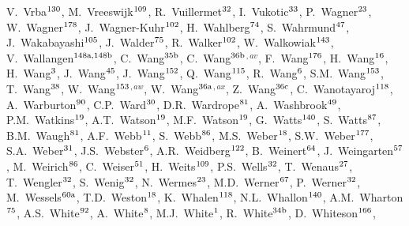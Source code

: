 \begin{flushleft}
V.~Vrba$^\textrm{\scriptsize 130}$,
M.~Vreeswijk$^\textrm{\scriptsize 109}$,
R.~Vuillermet$^\textrm{\scriptsize 32}$,
I.~Vukotic$^\textrm{\scriptsize 33}$,
P.~Wagner$^\textrm{\scriptsize 23}$,
W.~Wagner$^\textrm{\scriptsize 178}$,
J.~Wagner-Kuhr$^\textrm{\scriptsize 102}$,
H.~Wahlberg$^\textrm{\scriptsize 74}$,
S.~Wahrmund$^\textrm{\scriptsize 47}$,
J.~Wakabayashi$^\textrm{\scriptsize 105}$,
J.~Walder$^\textrm{\scriptsize 75}$,
R.~Walker$^\textrm{\scriptsize 102}$,
W.~Walkowiak$^\textrm{\scriptsize 143}$,
V.~Wallangen$^\textrm{\scriptsize 148a,148b}$,
C.~Wang$^\textrm{\scriptsize 35b}$,
C.~Wang$^\textrm{\scriptsize 36b}$$^{,av}$,
F.~Wang$^\textrm{\scriptsize 176}$,
H.~Wang$^\textrm{\scriptsize 16}$,
H.~Wang$^\textrm{\scriptsize 3}$,
J.~Wang$^\textrm{\scriptsize 45}$,
J.~Wang$^\textrm{\scriptsize 152}$,
Q.~Wang$^\textrm{\scriptsize 115}$,
R.~Wang$^\textrm{\scriptsize 6}$,
S.M.~Wang$^\textrm{\scriptsize 153}$,
T.~Wang$^\textrm{\scriptsize 38}$,
W.~Wang$^\textrm{\scriptsize 153}$$^{,aw}$,
W.~Wang$^\textrm{\scriptsize 36a}$$^{,ax}$,
Z.~Wang$^\textrm{\scriptsize 36c}$,
C.~Wanotayaroj$^\textrm{\scriptsize 118}$,
A.~Warburton$^\textrm{\scriptsize 90}$,
C.P.~Ward$^\textrm{\scriptsize 30}$,
D.R.~Wardrope$^\textrm{\scriptsize 81}$,
A.~Washbrook$^\textrm{\scriptsize 49}$,
P.M.~Watkins$^\textrm{\scriptsize 19}$,
A.T.~Watson$^\textrm{\scriptsize 19}$,
M.F.~Watson$^\textrm{\scriptsize 19}$,
G.~Watts$^\textrm{\scriptsize 140}$,
S.~Watts$^\textrm{\scriptsize 87}$,
B.M.~Waugh$^\textrm{\scriptsize 81}$,
A.F.~Webb$^\textrm{\scriptsize 11}$,
S.~Webb$^\textrm{\scriptsize 86}$,
M.S.~Weber$^\textrm{\scriptsize 18}$,
S.W.~Weber$^\textrm{\scriptsize 177}$,
S.A.~Weber$^\textrm{\scriptsize 31}$,
J.S.~Webster$^\textrm{\scriptsize 6}$,
A.R.~Weidberg$^\textrm{\scriptsize 122}$,
B.~Weinert$^\textrm{\scriptsize 64}$,
J.~Weingarten$^\textrm{\scriptsize 57}$,
M.~Weirich$^\textrm{\scriptsize 86}$,
C.~Weiser$^\textrm{\scriptsize 51}$,
H.~Weits$^\textrm{\scriptsize 109}$,
P.S.~Wells$^\textrm{\scriptsize 32}$,
T.~Wenaus$^\textrm{\scriptsize 27}$,
T.~Wengler$^\textrm{\scriptsize 32}$,
S.~Wenig$^\textrm{\scriptsize 32}$,
N.~Wermes$^\textrm{\scriptsize 23}$,
M.D.~Werner$^\textrm{\scriptsize 67}$,
P.~Werner$^\textrm{\scriptsize 32}$,
M.~Wessels$^\textrm{\scriptsize 60a}$,
T.D.~Weston$^\textrm{\scriptsize 18}$,
K.~Whalen$^\textrm{\scriptsize 118}$,
N.L.~Whallon$^\textrm{\scriptsize 140}$,
A.M.~Wharton$^\textrm{\scriptsize 75}$,
A.S.~White$^\textrm{\scriptsize 92}$,
A.~White$^\textrm{\scriptsize 8}$,
M.J.~White$^\textrm{\scriptsize 1}$,
R.~White$^\textrm{\scriptsize 34b}$,
D.~Whiteson$^\textrm{\scriptsize 166}$,
$$
\end{flushleft}
